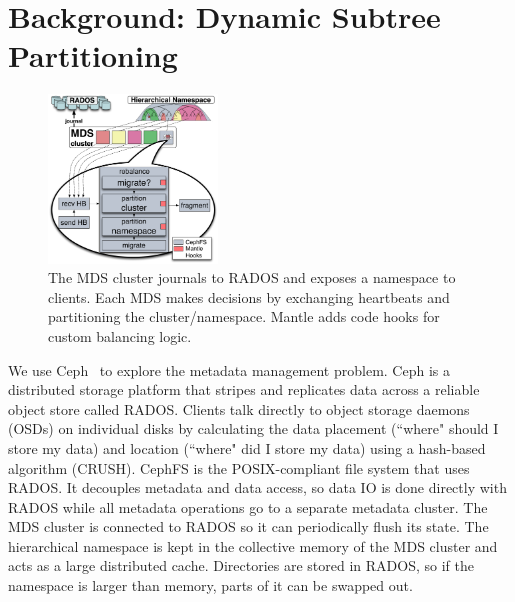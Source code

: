 \section{Background: Dynamic Subtree Partitioning}	%
\label{background_dynamic_subtree_partitioning}			%
\begin{figure}[tb]
	\centering	
	\includegraphics[width=0.4\textwidth]{./chapters/mantle/balancer-diagram.pdf}
 	\caption{The MDS cluster journals to RADOS and exposes a namespace to clients. Each MDS makes decisions by exchanging heartbeats and partitioning the cluster/namespace. Mantle adds code hooks for custom balancing logic.\label{figure:balancer-diagram}}    
\end{figure}   

We use Ceph~\cite{weil:osdi2006-ceph} to explore the metadata management problem. Ceph is a distributed storage platform that stripes and replicates data across a reliable object store called RADOS. Clients talk directly to object storage daemons (OSDs) on individual disks by calculating the data placement (``where" should I store my data) and location (``where" did I store my data) using a hash-based algorithm (CRUSH). CephFS is the POSIX-compliant file system that uses RADOS. It decouples metadata and data access, so data IO is done directly with RADOS while all metadata operations go to a separate metadata cluster. The MDS cluster is connected to RADOS so it can periodically flush its state. The hierarchical namespace is kept in the collective memory of the MDS cluster and acts as a large distributed cache. Directories are stored in RADOS, so if the namespace is larger than memory, parts of it can be swapped out. 

